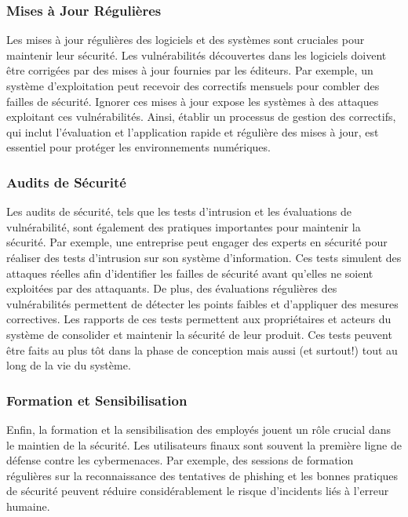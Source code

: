 \subsubsection{Mises à Jour Régulières}

Les mises à jour régulières des logiciels et des systèmes sont cruciales pour maintenir leur sécurité. Les vulnérabilités découvertes dans les logiciels doivent être corrigées par des mises à jour fournies par les éditeurs. Par exemple, un système d'exploitation peut recevoir des correctifs mensuels pour combler des failles de sécurité. Ignorer ces mises à jour expose les systèmes à des attaques exploitant ces vulnérabilités. Ainsi, établir un processus de gestion des correctifs, qui inclut l'évaluation et l'application rapide et régulière des mises à jour, est essentiel pour protéger les environnements numériques.

\subsubsection{Audits de Sécurité}

Les audits de sécurité, tels que les tests d'intrusion et les évaluations de vulnérabilité, sont également des pratiques importantes pour maintenir la sécurité. Par exemple, une entreprise peut engager des experts en sécurité pour réaliser des tests d'intrusion sur son système d'information. Ces tests simulent des attaques réelles afin d'identifier les failles de sécurité avant qu'elles ne soient exploitées par des attaquants. De plus, des évaluations régulières des vulnérabilités permettent de détecter les points faibles et d'appliquer des mesures correctives. Les rapports de ces tests permettent aux propriétaires et acteurs du système de consolider et maintenir la sécurité de leur produit. Ces tests peuvent être faits au plus tôt dans la phase de conception mais aussi (et surtout!) tout au long de la vie du système.

\subsubsection{Formation et Sensibilisation}

Enfin, la formation et la sensibilisation des employés jouent un rôle crucial dans le maintien de la sécurité. Les utilisateurs finaux sont souvent la première ligne de défense contre les cybermenaces. Par exemple, des sessions de formation régulières sur la reconnaissance des tentatives de phishing et les bonnes pratiques de sécurité peuvent réduire considérablement le risque d'incidents liés à l'erreur humaine.

